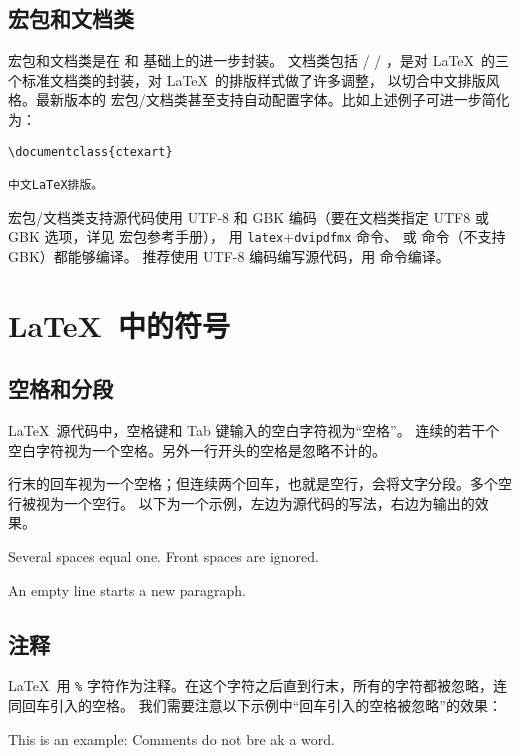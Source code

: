 \subsection{ 宏包和文档类}

 宏包和文档类是在  和  基础上的进一步封装。 文档类包括
 /  / ，是对 \LaTeX\ 的三个标准文档类的封装，对 \LaTeX\ 的排版样式做了许多调整，
以切合中文排版风格。最新版本的  宏包/文档类甚至支持自动配置字体。比如上述例子可进一步简化为：
\begin{verbatim}
\documentclass{ctexart}

中文LaTeX排版。

\end{verbatim}

 宏包/文档类支持源代码使用 UTF-8 和 GBK 编码（要在文档类指定 UTF8 或 GBK 选项，详见  宏包参考手册），
用 \texttt{latex}+\texttt{dvipdfmx} 命令、 或  命令（不支持 GBK）都能够编译。
推荐使用 UTF-8 编码编写源代码，用  命令编译。

\section{\LaTeX\ 中的符号}

\subsection{空格和分段}\label{subsec:spaces}

\LaTeX\ 源代码中，空格键和 Tab 键输入的空白字符视为“空格”。
连续的若干个空白字符视为一个空格。另外一行开头的空格是忽略不计的。

行末的回车视为一个空格；但连续两个回车，也就是空行，会将文字分段。多个空行被视为一个空行。
以下为一个示例，左边为源代码的写法，右边为输出的效果。
\begin{example}
Several spaces     equal one.
  Front spaces are ignored.

An empty line starts a new
paragraph.
\end{example}

\subsection{注释}\label{subsec:comments}

\LaTeX\ 用 \texttt\% 字符作为注释。在这个字符之后直到行末，所有的字符都被忽略，连同回车引入的空格。
我们需要注意以下示例中“回车引入的空格被忽略”的效果：
\begin{example}
This is an %
example: Comments do not bre%
ak a word.
\end{example}

